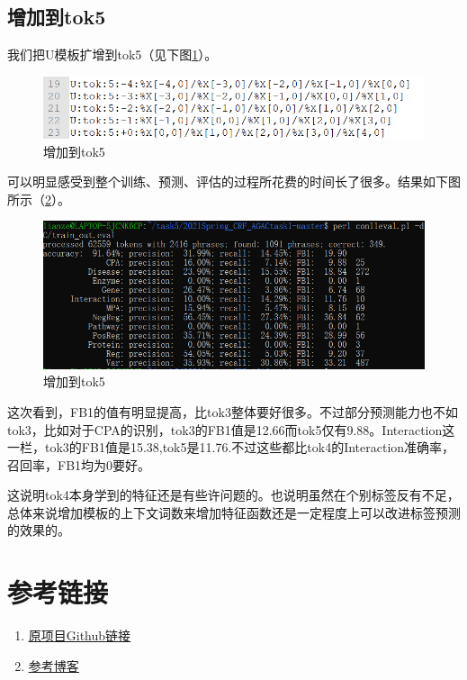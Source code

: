\documentclass[12pt]{article}
\begin{document}
\subsection{增加到tok5}
我们把U模板扩增到tok5（见下图\ref{256556}）。
\begin{figure}[H]
  \centering
  \includegraphics[scale=0.5]{./picture/tok5wa.png} %
  \caption{增加到tok5} %
  \label{256556} %
\end{figure}
可以明显感受到整个训练、预测、评估的过程所花费的时间长了很多。结果如下图所示（\ref{2123345555}）。
\begin{figure}[H]
  \centering
  \includegraphics[scale=0.5]{./picture/tok5.png} %
  \caption{增加到tok5} %
  \label{2123345555} %
\end{figure}
这次看到，FB1的值有明显提高，比tok3整体要好很多。不过部分预测能力也不如tok3，比如对于CPA的识别，tok3的FB1值是12.66而tok5仅有9.88。Interaction这一栏，tok3的FB1值是15.38,tok5是11.76.不过这些都比tok4的Interaction准确率，召回率，FB1均为0要好。\par
这说明tok4本身学到的特征还是有些许问题的。也说明虽然在个别标签反有不足，总体来说增加模板的上下文词数来增加特征函数还是一定程度上可以改进标签预测的效果的。
\section{参考链接}
\begin{enumerate}
\item \href{https://github.com/bionlp-hzau/2021Spring_CRF_AGACtask1}{\underline{原项目Github链接}}
\item \href{https://blog.csdn.net/m0_51732188/article/details/109318840}{\underline{参考博客}}

\end{enumerate}



\end{document}
